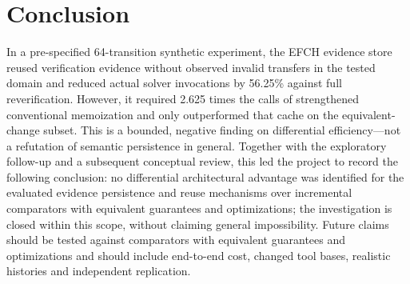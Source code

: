 \documentclass[10pt,twocolumn]{article}
\newcommand{\efch}{\textsc{EFCH}}
\begin{document}
\section{Conclusion}
In a pre-specified 64-transition synthetic experiment, the \efch{} evidence store reused verification evidence without observed invalid transfers in the tested domain and reduced actual solver invocations by 56.25\% against full reverification. However, it required 2.625 times the calls of strengthened conventional memoization and only outperformed that cache on the equivalent-change subset. This is a bounded, negative finding on differential efficiency---not a refutation of semantic persistence in general. Together with the exploratory follow-up and a subsequent conceptual review, this led the project to record the following conclusion: no differential architectural advantage was identified for the evaluated evidence persistence and reuse mechanisms over incremental comparators with equivalent guarantees and optimizations; the investigation is closed within this scope, without claiming general impossibility. Future claims should be tested against comparators with equivalent guarantees and optimizations and should include end-to-end cost, changed tool bases, realistic histories and independent replication.
\end{document}
